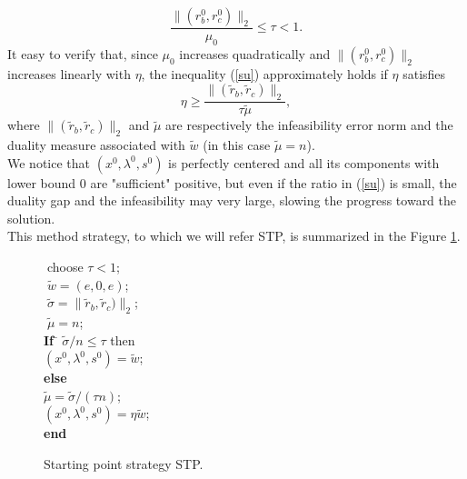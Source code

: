 \documentclass[a4paper,10 pt,titlepage,twoside]{report}
\theoremstyle{plain}
\theoremstyle{definition}
\theoremstyle{remark}
\begin{document}
{{\begin{equation}\label{su}
\frac{\lVert(r^{0}_{b},r^{0}_{c})\rVert_{2}}{\mu_{0}}\leq \tau<1. 
\end{equation}
It easy to verify that, since $\mu_{0}$ increases quadratically and $\lVert(r^{0}_{b},r^{0}_{c})\rVert_{2}$ increases linearly with $\eta$, the inequality (\ref{su}) approximately holds if $\eta$ satisfies
\begin{equation*}
\eta\geq \frac{\lVert(\tilde{r}_{b},\tilde{r}_{c})\rVert_{2}}{\tau\tilde{\mu}},
\end{equation*}
where $\lVert(\tilde{r}_{b},\tilde{r}_{c})\rVert_{2}$ and $\tilde{\mu}$ are respectively the infeasibility error norm and the duality measure associated with $\tilde{w}$ (in this case $\tilde{\mu} = n$). \\
We notice that $(x^{0},\lambda^{0},s^{0})$ is perfectly centered and all its components with lower bound 0 are "sufficient" positive, but even if the ratio in (\ref{su}) is small, the duality gap and the infeasibility may very large, slowing the progress toward the solution.\\
This method strategy, to which we will refer STP, is summarized in the Figure \ref{fig:STP2}.\\
\begin{figure}\caption{\label{fig:STP2}Starting point strategy STP.}
	\centering
	{\noindent\begin{boxedminipage}{1\linewidth}
			\begin{tabbing}
			$\;$choose $\tau < 1$;  \\
			$\;\tilde{w}=(e,0,e)$;\\
			$\;\tilde{\sigma}= \lVert\tilde{r}_{b},\tilde{r}_{c})\rVert_{2}$;\\
			$\;\tilde{\mu}= n$;\\
			\textbf{ If} \= $\tilde{\sigma}/n\leq \tau$ then\\
			\> $(x^{0}, \lambda^{0}, s^{0}) = \tilde{w}$;$\;\;\;\;\;\;$\\
			\textbf{ else}\>\\
			\> $\tilde{\mu}=\tilde{\sigma}/(\tau n)$; \\
            \> $(x^{0}, \lambda^{0}, s^{0}) = \eta \tilde{w}$;\tab \\
			\textbf{ end}
			\end{tabbing}
\end{boxedminipage}
} \quad
\end{figure}

}}
\end{document}
